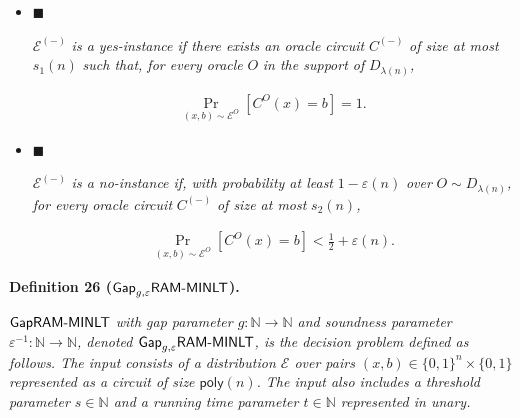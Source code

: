 \begin{itemize}


\item[] 
$\blacksquare$ 


$\mathcal{E}^{(-)}$\emph{ is a yes-instance if there exists an oracle circuit }$C^{(-)}$\emph{ of size at most }$s_{1}(n)$\emph{ such that, for every oracle }$O$\emph{ in the support of }$D_{\lambda(n)}$\emph{,}\par


\[\begin{gathered}
\Pr_{(x,b)\sim\mathcal{E}^{O}}\left[C^{O}(x)=b\right]=1.
\end{gathered}\]





\item[] 
$\blacksquare$ 


$\mathcal{E}^{(-)}$\emph{ is a no-instance if, with probability at least }$1-\varepsilon(n)$\emph{ over }$O\sim D_{\lambda(n)}$\emph{, for every oracle circuit }$C^{(-)}$\emph{ of size at most }$s_{2}(n)$\emph{,}\par


\[\begin{gathered}
\Pr_{(x,b)\sim\mathcal{E}^{O}}\left[C^{O}(x)=b\right]<\frac{1}{2}+\varepsilon(n).
\end{gathered}\]





\end{itemize}







\par\medskip\noindent\textbf{
\textbf{Definition 26}\textbf{ }(${\sf Gap}_{g,\varepsilon}{\sf RAM}\text{-}{\sf MINLT}$)\textbf{.}
}\par



${\sf Gap}{\sf RAM}\text{-}{\sf MINLT}$\emph{ with gap parameter $g:\mathbb{N}\to\mathbb{N}$ and soundness parameter $\varepsilon^{-1}:\mathbb{N}\to\mathbb{N}$, denoted ${\sf Gap}_{g,\varepsilon}{\sf RAM}\text{-}{\sf MINLT}$, is the decision problem defined as follows. The input consists of a distribution $\mathcal{E}$ over pairs $(x,b)\in\{0,1\}^{n}\times\{0,1\}$ represented as a circuit of size ${\mathsf{poly}}(n)$. The input also includes a threshold parameter $s\in\mathbb{N}$ and a running time parameter $t\in\mathbb{N}$ represented in unary.}\par


